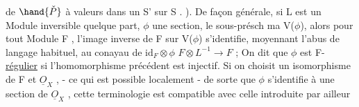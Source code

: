 de $\hand{\check{P}}$ \`a valeurs dans un S' sur S . ). \hand{\unsure{(}}De fa\c{c}on g\'en\'erale, si L est un
Module inversible quelque part, $\phi$ une section,  le sous-pr\'esch
ma V($\phi$), alors pour tout Module F , l'image inverse de F sur V($\phi$)
s'identifie, moyennant l'abus de langage habituel, au conayau de $\mathrm{id}_F\otimes\phi$
$F\otimes L^{-1} \longrightarrow F$ ; On dit que $\phi$ est F-\uline{r\'egulier} si l'homomorphisme pr\'ec\'edent
est injectif. Si on choisit un isomorphisme de F et $\underline{O}_X$ , - ce qui
est possible localement - de sorte que $\phi$ s'identifie \`a une section de
$\underline{O}_X$ , cette terminologie est compatible avec celle  introduite par ailleur

